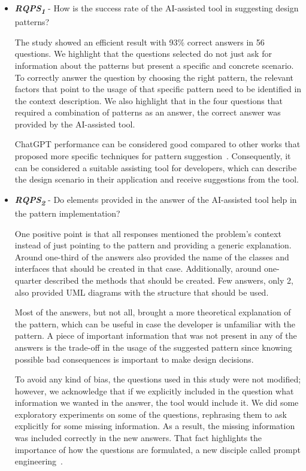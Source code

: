 \begin{itemize}
    \item  \textbf{\textit{RQPS\textsubscript{1}}} - How is the success rate of the AI-assisted tool in suggesting design patterns?\label{sec5sub1}
    
    The study showed an efficient result with 93\% correct answers in 56 questions. We highlight that the questions selected do not just ask for information about the patterns but present a specific and concrete scenario. To correctly answer the question by choosing the right pattern, the relevant factors that point to the usage of that specific pattern need to be identified in the context description. We also highlight that in the four questions that required a combination of patterns as an answer, the correct answer was provided by the AI-assisted tool.

    ChatGPT performance can be considered good compared to other works that proposed more specific techniques for pattern suggestion~\cite{Hussain2019automated, Naghdipour2023Semi}. Consequently, it can be considered a suitable assisting tool for developers, which can describe the design scenario in their application and receive suggestions from the tool.

     \item  \textbf{\textit{RQPS\textsubscript{2}}}  - Do elements provided in the answer of the AI-assisted tool help in the pattern implementation?\label{sec5sub2}

     One positive point is that all responses mentioned the problem's context instead of just pointing to the pattern and providing a generic explanation. Around one-third of the answers also provided the name of the classes and interfaces that should be created in that case. Additionally, around one-quarter described the methods that should be created. Few answers, only 2, also provided UML diagrams with the structure that should be used.

    Most of the answers, but not all, brought a more theoretical explanation of the pattern, which can be useful in case the developer is unfamiliar with the pattern. A piece of important information that was not present in any of the answers is the trade-off in the usage of the suggested pattern since knowing possible bad consequences is important to make design decisions.
    
    To avoid any kind of bias, the questions used in this study were not modified; however, we acknowledge that if we explicitly included in the question what information we wanted in the answer, the tool would include it. We did some exploratory experiments on some of the questions, rephrasing them to ask explicitly for some missing information. As a result, the missing information was included correctly in the new answers. That fact highlights the importance of how the questions are formulated, a new disciple called prompt engineering~\cite{White2023}.  


\end{itemize}
